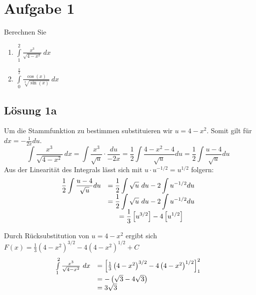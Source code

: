 \documentclass[main.tex]{subfiles}
\begin{document}
\section{Aufgabe 1}
Berechnen Sie
\begin{enumerate}
    \item $\int\limits _{1}^{2}\frac{x^{3}}{\sqrt{4-x^{2}}} \ dx$
    \item $\int\limits _{0}^{\frac{\pi }{2}}\frac{\cos( x)}{\sqrt[3]{\sin( x)}} \ dx$
\end{enumerate}

\subsection{Lösung 1a}
Um die Stammfunktion zu bestimmen substituieren wir $u=4-x^{2}$. Somit gilt für $dx=-\frac{1}{2x} du$.
\begin{equation*}
    \int \frac{x^{3}}{\sqrt{4-x^{2}}} \ dx=\int \frac{x^{3}}{\sqrt{u}} \cdot \frac{du}{-2x} =\frac{1}{2}\int \frac{4-x^{2} -4}{\sqrt{u}} du=\frac{1}{2}\int \frac{u-4}{\sqrt{u}} du
\end{equation*}
Aus der Linearität des Integrals lässt sich mit $u\cdotp u^{-1/2} =u^{1/2}$ folgern:
\begin{equation*}
    {\displaystyle \begin{array}{ c c }
    {\displaystyle \frac{1}{2}\int \frac{u-4}{\sqrt{u}} du} & {\displaystyle =\frac{1}{2}\int \sqrt{u} \ du-2\int u^{-1/2} du}\\
    & {\displaystyle =\frac{1}{2}\int \sqrt{u} \ du-2\int u^{-1/2} du}\\
    & {\displaystyle =\frac{1}{3}\left[ u^{3/2}\right] -4\left[ u^{1/2}\right]}
    \end{array}}
\end{equation*}

Durch Rücksubstitution von $u=4-x^{2}$ ergibt sich $F( x) =\frac{1}{3}\left( 4-x^{2}\right)^{3/2} -4\left( 4-x^{2}\right)^{1/2} +C$
\begin{equation*}
    \begin{array}{ c l }
    \int\limits _{1}^{2}\frac{x^{3}}{\sqrt{4-x^{2}}} \ dx & =\left[\frac{1}{3}\left( 4-x^{2}\right)^{3/2} -4\left( 4-x^{2}\right)^{1/2}\right]_{1}^{2}\\
    & =-\left(\sqrt{3} -4\sqrt{3}\right)\\
    & =3\sqrt{3}
    \end{array}
\end{equation*}
\end{document}
